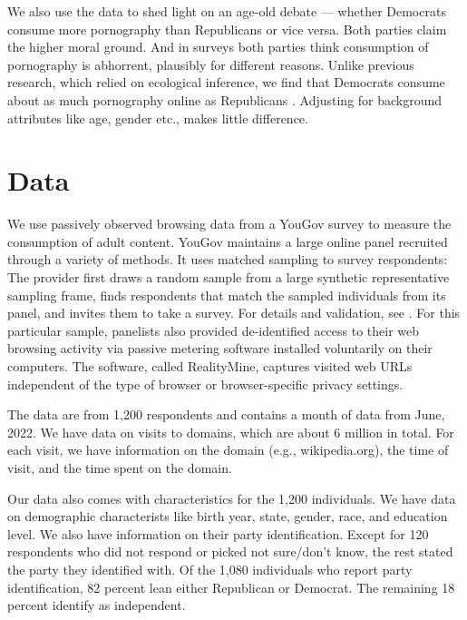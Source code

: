 \documentclass[12pt, letterpaper]{article}
\begin{document}
We also use the data to shed light on an age-old debate --- whether Democrats consume more pornography than Republicans or vice versa. Both parties claim the higher moral ground. And in surveys both parties think consumption of pornography is abhorrent, plausibly for different reasons. Unlike previous research, which relied on ecological inference, we find that Democrats consume about as much pornography online as Republicans \citep{macinnis2015american, edelman2009markets}. Adjusting for background attributes like age, gender etc., makes little difference.

\section*{Data}\label{sec:data}
We use passively observed browsing data from a YouGov survey to measure the consumption of adult content. YouGov maintains a large online panel recruited through a variety of methods. It uses matched sampling to survey respondents: The provider first draws a random sample from a large synthetic representative sampling frame, finds respondents that match the sampled individuals from its panel, and invites them to take a survey. For details and validation, see \citet{rivers2009}. For this particular sample, panelists also provided de-identified access to their web browsing activity via passive metering software installed voluntarily on their computers. The software, called RealityMine, captures visited web URLs independent of the type of browser or browser-specific privacy settings. 

The data are from 1,200 respondents and contains a month of data from June, 2022.  We have data on visits to domains, which are about 6 million in total. For each visit, we have information on the domain (e.g., wikipedia.org), the time of visit, and the time spent on the domain. 

Our data also comes with characteristics for the 1,200 individuals. We have data on demographic characterists like birth year, state, gender, race, and education level. We also have information on their party identification. Except for 120 respondents  who did not respond or picked not sure/don't know, the rest stated the party they identified with.  Of the 1,080 individuals who report party identification, 82 percent lean either Republican or Democrat. The remaining 18 percent identify as independent. 
\end{document}
